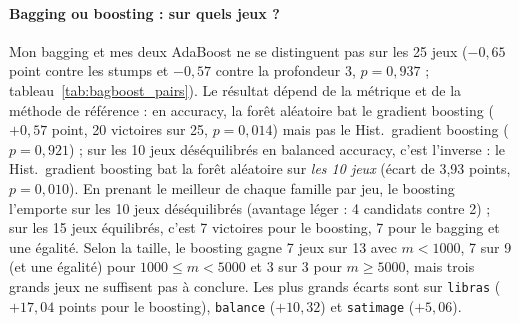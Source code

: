 \documentclass[11pt,a4paper]{article}
\begin{document}
\paragraph{Bagging ou boosting : sur quels jeux ?}
Mon bagging et mes deux AdaBoost ne se distinguent pas sur les 25 jeux ($-0{,}65$ point contre les stumps et $-0{,}57$ contre la profondeur 3, $p=0{,}937$ ; tableau~\ref{tab:bagboost_pairs}). Le résultat dépend de la métrique et de la méthode de référence : en accuracy, la forêt aléatoire bat le gradient boosting ($+0{,}57$ point, 20 victoires sur 25, $p=0{,}014$) mais pas le Hist.\ gradient boosting
($p=0{,}921$) ; sur les 10 jeux déséquilibrés en balanced accuracy, c'est l'inverse : le Hist.\ gradient boosting bat la forêt aléatoire sur \emph{les 10 jeux} (écart de 3,93 points, $p=0{,}010$). En prenant le meilleur de chaque famille par jeu, le boosting l'emporte sur les 10 jeux déséquilibrés (avantage léger : 4 candidats contre 2) ; sur les 15 jeux équilibrés, c'est 7 victoires
pour le boosting, 7 pour le bagging et une égalité. Selon la taille, le boosting gagne 7 jeux sur 13 avec $m<1000$, 7 sur 9 (et une égalité) pour $1000\le m<5000$ et 3 sur 3 pour $m\ge 5000$, mais trois grands jeux ne suffisent pas à conclure. Les plus grands écarts sont sur \texttt{libras} ($+17{,}04$ points pour le boosting), \texttt{balance} ($+10{,}32$) et \texttt{satimage} ($+5{,}06$).

\end{document}
